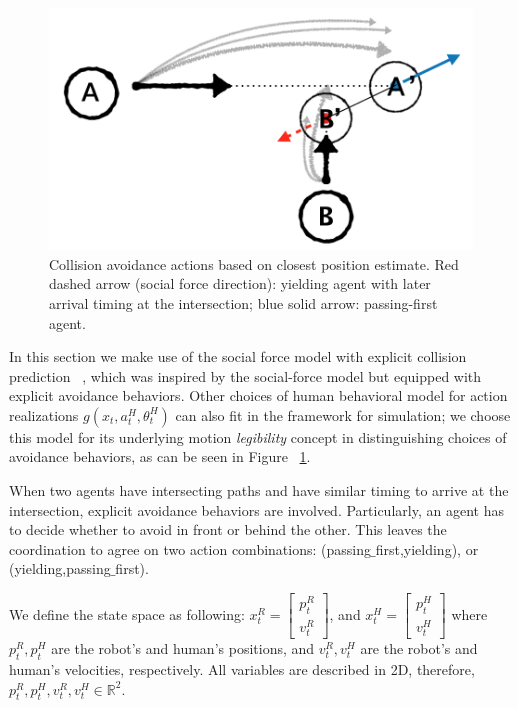 \documentclass[letterpaper, 10 pt, conference]{ieeeconf}  %
\begin{document}
   \begin{figure}[t]
      \centering
      \vspace{-1em}
      \includegraphics[scale=0.27]{pedestrian_avoidance}
      \vspace{-1em}
      \caption{Collision avoidance actions based on closest position estimate. 
      Red dashed arrow (social force direction): yielding agent with later 
      arrival timing at the intersection; blue solid arrow: passing-first agent. }
      \vspace{-1.5em}
     \label{fig:legibility}
   \end{figure}

In this section we make use of the social force model with explicit collision prediction ~\cite{zanlungo2011social}, which was inspired by the social-force model but equipped with explicit avoidance behaviors. Other choices of human behavioral model for action realizations 
$g(x_t,a^H_t,\theta^H_t)$ can also fit in the framework for simulation; we choose this model for its underlying motion \textit{legibility} concept in distinguishing choices of avoidance behaviors, as can be seen in Figure ~\ref{fig:legibility}.  

When two agents have intersecting paths and have similar timing to arrive at the intersection, explicit avoidance behaviors are involved. Particularly, an agent has to decide whether to avoid in front or behind the other. This leaves the coordination to agree on two action combinations: (passing$\_$first,yielding), or (yielding,passing$\_$first). 

We define the state space as following: $x_t^R = \begin{bmatrix}
p^R_t\\
v^R_t
\end{bmatrix}$, and $x_t^H = \begin{bmatrix}
p^H_t\\
v^H_t
\end{bmatrix}$
where $p^R_t, p^H_t$ are the robot's and human's positions, and $v^R_t,v^H_t$ are the robot's and human's velocities, respectively. All variables are described in 2D, therefore, $p^R_t,p^H_t,v^R_t,v^H_t \in \mathbb{R}^2$. 
\end{document}
